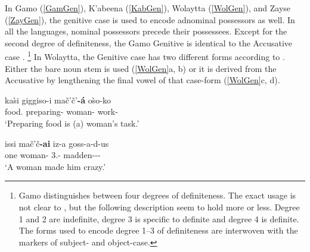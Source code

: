 In Gamo (\ref{GamGen}), K'abeena (\ref{KabGen}), Wolaytta (\ref{WolGen}), and Zayse (\ref{ZayGen}), the genitive case is used  to encode adnominal possessors as well. 
In all the languages, nominal possessors precede their possessees.
Except for the second degree of definiteness, the Gamo Genitive is identical to the Accusative case \citep[380]{Hompo:1990}.
\footnote{Gamo distinguishes between four degrees of definiteness. 
The exact usage is not clear to \citet[367]{Hompo:1990}, but the following description seem to hold more or less.
Degree 1 and 2 are indefinite, degree 3 is specific to definite and degree 4 is definite. 
The forms used to encode degree 1--3 of definiteness are interwoven with the markers of subject- and object-case.}
In Wolaytta,  the Genitive case has two different forms according to \citet[217--218]{Lamberti:1997}. 
Either the bare noun stem is used (\ref{WolGen}a, b) or it is derived from the Accusative by lengthening the final vowel of that case-form (\ref{WolGen}c, d).

\begin{exe}\ex\label{GamGen}
\begin{xlist}
\ex\gll ka\`si giggiso-i ma\v c'\v c'\textbf{-\'a} o\`so-ko\\
food.\acc{} preparing-\nom{} woman-\gen{} work-\cop{}\\
\glt `Preparing food is (a) woman's task.'

\ex\gll issi ma\v c'\v c\textbf{-ai} iz-a goss-a-d-us\\
one woman-\nom{} 3\sg{}.\mas{}-\acc{} madden-\persm-\tns{}-\complx{}\\
\glt `A woman made him crazy.'
\end{xlist}
\end{exe}

